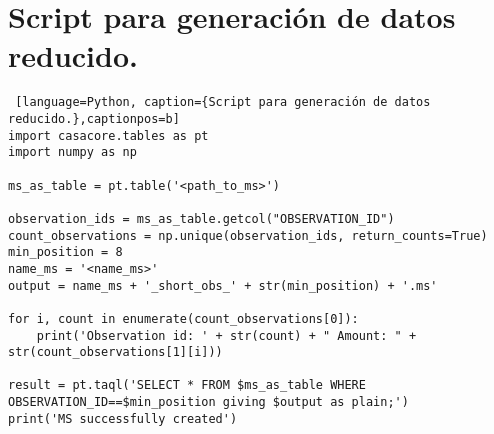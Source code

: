 \chapter{Script para generación de datos reducido.}
\label{finales:apendice4}

\begin{lstlisting} [language=Python, caption={Script para generación de datos reducido.},captionpos=b]
import casacore.tables as pt
import numpy as np

ms_as_table = pt.table('<path_to_ms>')

observation_ids = ms_as_table.getcol("OBSERVATION_ID")
count_observations = np.unique(observation_ids, return_counts=True)
min_position = 8
name_ms = '<name_ms>'
output = name_ms + '_short_obs_' + str(min_position) + '.ms'

for i, count in enumerate(count_observations[0]):
    print('Observation id: ' + str(count) + " Amount: " + str(count_observations[1][i]))

result = pt.taql('SELECT * FROM $ms_as_table WHERE OBSERVATION_ID==$min_position giving $output as plain;')
print('MS successfully created')
\end{lstlisting}